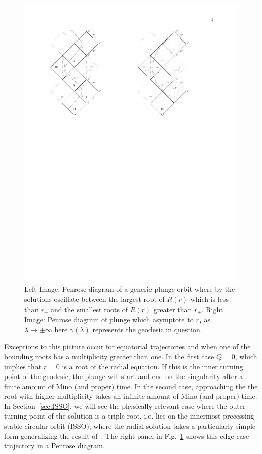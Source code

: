 \documentclass[12pt, amsmath]{revtex4-2}
\newcommand\lam{\lambda}
\begin{document}
\begin{figure}[tb!]
    \includegraphics[width=130mm]{PenrosePlot.pdf}
    \caption{Left Image: Penrose diagram of a generic plunge orbit where by the solutions oscillate between the largest root of $R(r)$ which is less than $r_-$ and the smallest roots of $R(r)$ greater than $r_+$. Right Image: Penrose diagram of plunge which asymptote to $r_I$ as $\lam\rightarrow \pm\infty$ here $\gamma(\lam)$ represents the geodesic in question. }
     \label{fig:penrose}
\end{figure}
Exceptions to this picture occur for equatorial trajectories and when one of the bounding roots has a multiplicity greater than one. In the first case $Q=0$, which  implies that $r=0$ is a root of the radial equation. If this is the inner turning point of the geodesic, the plunge will start and end on the singularity after a finite amount of Mino (and proper) time. In the second case, approaching the the root with higher multiplicity takes an infinite amount of Mino (and proper) time. In Section~\ref{sec:ISSO}, we will see the physically relevant case where the outer turning point of the solution is a triple root, i.e. lies on the  innermost precessing stable circular orbit (ISSO), where the radial solution takes a particularly simple form generalizing the result of~\cite{Mummery:2022ana}. The right panel in Fig.~\ref{fig:penrose} shows this edge case trajectory in a Penrose diagram.
\end{document}
